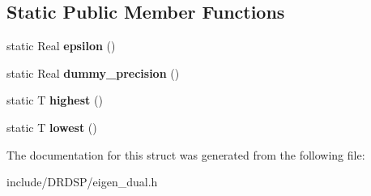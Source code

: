 \subsection*{Static Public Member Functions}
\begin{DoxyCompactItemize}
\item 
\hypertarget{struct_eigen_1_1_num_traits_3_01dual_3_01_t_01_4_01_4_a3a6553abba83520cc82e79e720c7421c}{static Real {\bfseries epsilon} ()}\label{struct_eigen_1_1_num_traits_3_01dual_3_01_t_01_4_01_4_a3a6553abba83520cc82e79e720c7421c}

\item 
\hypertarget{struct_eigen_1_1_num_traits_3_01dual_3_01_t_01_4_01_4_aaf513a1cd4679b584422030e99679369}{static Real {\bfseries dummy\-\_\-precision} ()}\label{struct_eigen_1_1_num_traits_3_01dual_3_01_t_01_4_01_4_aaf513a1cd4679b584422030e99679369}

\item 
\hypertarget{struct_eigen_1_1_num_traits_3_01dual_3_01_t_01_4_01_4_aceabe7479baf090b5d7791d9d1236c15}{static T {\bfseries highest} ()}\label{struct_eigen_1_1_num_traits_3_01dual_3_01_t_01_4_01_4_aceabe7479baf090b5d7791d9d1236c15}

\item 
\hypertarget{struct_eigen_1_1_num_traits_3_01dual_3_01_t_01_4_01_4_aa6eb996ed665ef6c34755ce25323412e}{static T {\bfseries lowest} ()}\label{struct_eigen_1_1_num_traits_3_01dual_3_01_t_01_4_01_4_aa6eb996ed665ef6c34755ce25323412e}

\end{DoxyCompactItemize}


The documentation for this struct was generated from the following file\-:\begin{DoxyCompactItemize}
\item 
include/\-D\-R\-D\-S\-P/eigen\-\_\-dual.\-h\end{DoxyCompactItemize}
